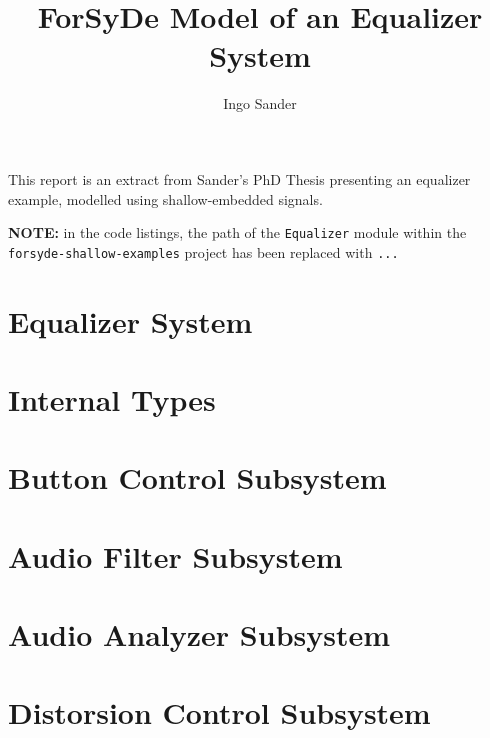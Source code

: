 \documentclass{article}
\title{ForSyDe Model of an Equalizer System}
\author{Ingo Sander}
\date{}
\begin{document}
\maketitle

This report is an extract from Sander's PhD Thesis \cite{San03} presenting an equalizer example, modelled using shallow-embedded signals. 

\begin{framed}
  \textbf{NOTE:} in the code listings, the path of the \texttt{Equalizer} module within the \texttt{forsyde-shallow-examples} project has been replaced with \texttt{...}
\end{framed}


\section{Equalizer System}
\label{sec:equalizer-top-moule}


\section{Internal Types}
\label{sec:internal-types}


\section{Button Control Subsystem}
\label{sec:butt-contr-module}


\section{Audio Filter Subsystem}
\label{sec:audio-filter-module}


\section{Audio Analyzer Subsystem}
\label{sec:audio-analyz-module}


\section{Distorsion Control Subsystem}
\label{sec:dist-contr-module}




\printbibliography
\end{document}
